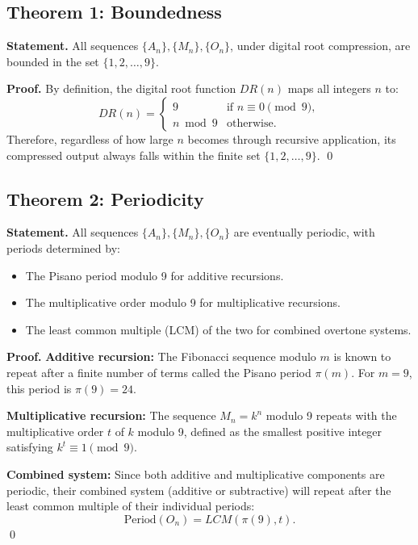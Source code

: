 \documentclass[12pt]{article}
\begin{document}
\subsection{Theorem 1: Boundedness}

\textbf{Statement.}  
All sequences \( \{A_n\}, \{M_n\}, \{O_n\} \), under digital root compression, are bounded in the set \( \{1, 2, \dots, 9\} \).

\textbf{Proof.}  
By definition, the digital root function \( DR(n) \) maps all integers \( n \) to:
\[
DR(n) =
\begin{cases}
9 & \text{if } n \equiv 0 \pmod{9}, \\
n \bmod 9 & \text{otherwise}.
\end{cases}
\]
Therefore, regardless of how large \( n \) becomes through recursive application, its compressed output always falls within the finite set \( \{1, 2, \dots, 9\} \).  
\qed

\subsection{Theorem 2: Periodicity}

\textbf{Statement.}  
All sequences \( \{A_n\}, \{M_n\}, \{O_n\} \) are eventually periodic, with periods determined by:
\begin{itemize}
    \item The Pisano period modulo 9 for additive recursions.
    \item The multiplicative order modulo 9 for multiplicative recursions.
    \item The least common multiple (LCM) of the two for combined overtone systems.
\end{itemize}

\textbf{Proof.}  
\textbf{Additive recursion:}  
The Fibonacci sequence modulo \( m \) is known to repeat after a finite number of terms called the Pisano period \( \pi(m) \). For \( m = 9 \), this period is \( \pi(9) = 24 \).

\textbf{Multiplicative recursion:}  
The sequence \( M_n = k^n \) modulo 9 repeats with the multiplicative order \( t \) of \( k \) modulo 9, defined as the smallest positive integer satisfying \( k^t \equiv 1 \pmod{9} \).

\textbf{Combined system:}  
Since both additive and multiplicative components are periodic, their combined system (additive or subtractive) will repeat after the least common multiple of their individual periods:
\[
\text{Period}(O_n) = LCM(\pi(9), t).
\]
\qed
\end{document}
